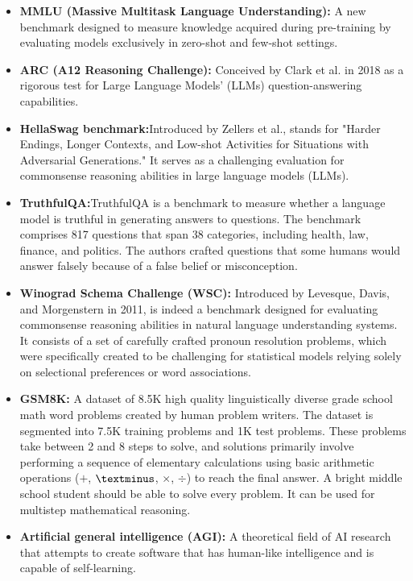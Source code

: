 \begin{itemize}
    \item \textbf{MMLU (Massive Multitask Language Understanding):} A new benchmark designed to measure knowledge acquired during pre-training by evaluating models exclusively in zero-shot and few-shot settings.
    
    \item \textbf{ARC (A12 Reasoning Challenge):} Conceived by Clark et al. in 2018 as a rigorous test for Large Language Models' (LLMs) question-answering capabilities.
    
    \item \textbf{HellaSwag benchmark:}Introduced by Zellers et al., stands for "Harder Endings, Longer Contexts, and Low-shot Activities for Situations with Adversarial Generations." It serves as a challenging evaluation for commonsense reasoning abilities in large language models (LLMs).
    
    \item \textbf{TruthfulQA:}TruthfulQA is a benchmark to measure whether a language model is truthful in generating answers to questions. The benchmark comprises 817 questions that span 38 categories, including health, law, finance, and politics. The authors crafted questions that some humans would answer falsely because of a false belief or misconception.
    
    \item \textbf{Winograd Schema Challenge (WSC):} Introduced by Levesque, Davis, and Morgenstern in 2011, is indeed a benchmark designed for evaluating commonsense reasoning abilities in natural language understanding systems. It consists of a set of carefully crafted pronoun resolution problems, which were specifically created to be challenging for statistical models relying solely on selectional preferences or word associations.
    
    \item \textbf{GSM8K:} A dataset of 8.5K high quality linguistically diverse grade school math word problems created by human problem writers. The dataset is segmented into 7.5K training problems and 1K test problems. These problems take between 2 and 8 steps to solve, and solutions primarily involve performing a sequence of elementary calculations using basic arithmetic operations ($+$, $\textminus$, $\times$, $\div$) to reach the final answer. A bright middle school student should be able to solve every problem. It can be used for multistep mathematical reasoning.
    
    \item \textbf{Artificial general intelligence (AGI):} A theoretical field of AI research that attempts to create software that has human-like intelligence and is capable of self-learning.
\end{itemize}
